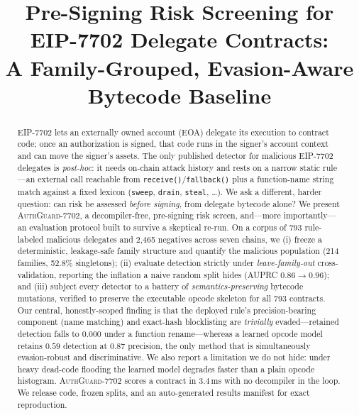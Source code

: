 \documentclass[conference]{IEEEtran}
\newcommand{\tool}{\textsc{AuthGuard-7702}}
\newcommand{\eip}{EIP-7702}
\newcommand{\code}[1]{\texttt{#1}}
\begin{document}
\title{Pre-Signing Risk Screening for \eip{} Delegate Contracts:\\
A Family-Grouped, Evasion-Aware Bytecode Baseline}

\author{
}

\maketitle

\begin{abstract}
\eip{} lets an externally owned account (EOA) delegate its execution to contract
code; once an authorization is signed, that code runs in the signer's account context
and can move the signer's assets. The only published detector for malicious \eip{}
delegates is \emph{post-hoc}: it needs on-chain attack history and rests on a narrow
static rule---an external call reachable from \code{receive()}/\code{fallback()} plus a
function-name string match against a fixed lexicon (\code{sweep}, \code{drain},
\code{steal}, \dots). We ask a different, harder question: can risk be assessed
\emph{before signing}, from delegate bytecode alone? We present \tool{}, a
decompiler-free, pre-signing risk screen, and---more importantly---an evaluation
protocol built to survive a skeptical re-run. On a corpus of 793 rule-labeled malicious
delegates and 2{,}465 negatives across seven chains, we (i) freeze a deterministic,
leakage-safe family structure and quantify the malicious population (214 families,
52.8\% singletons); (ii) evaluate detection strictly under \emph{leave-family-out}
cross-validation, reporting the inflation a naive random split hides (AUPRC
$0.86\!\rightarrow\!0.96$); and (iii) subject every detector to a battery of
\emph{semantics-preserving} bytecode mutations, verified to preserve the executable
opcode skeleton for all 793 contracts. Our central, honestly-scoped finding is that the
deployed rule's precision-bearing component (name matching) and exact-hash blocklisting
are \emph{trivially} evaded---retained detection falls to $0.000$ under a function
rename---whereas a learned opcode model retains $0.59$ detection at $0.87$ precision, the
only method that is simultaneously evasion-robust and discriminative. We also report a
limitation we do not hide: under heavy dead-code flooding the learned model degrades
faster than a plain opcode histogram. \tool{} scores a contract in $3.4$\,ms with no
decompiler in the loop. We release code, frozen splits, and an auto-generated results
manifest for exact reproduction.
\end{abstract}
\end{document}
